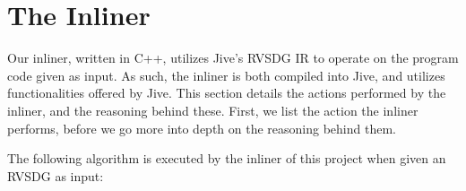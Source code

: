 
\clearpage
\section{The Inliner}
\label{sec:scheme}

Our inliner, written in C++, utilizes Jive's RVSDG IR to operate on the program
code given as input. As such, the inliner is both compiled into Jive, and
utilizes functionalities offered by Jive. This section details the actions
performed by the inliner, and the reasoning behind these. First, we list the
action the inliner performs, before we go more into depth on the reasoning
behind them.

The following algorithm is executed by the inliner of this project when given an
RVSDG as input:

